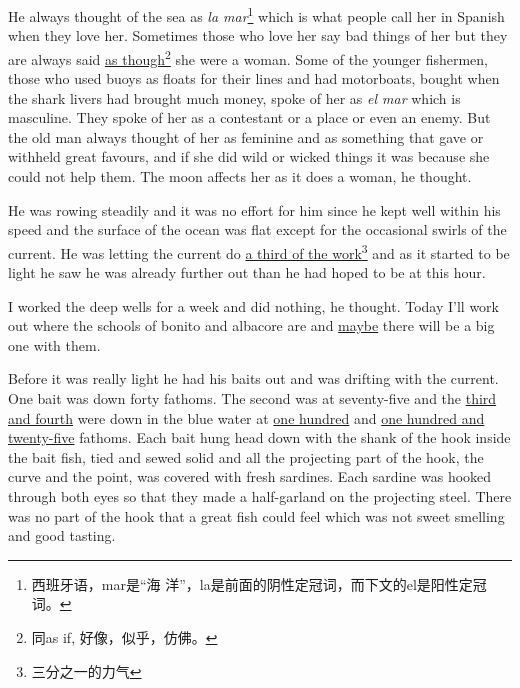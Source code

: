 He always thought of the sea as \emph{la mar}\footnote{西班牙语，mar是“海
  洋”，la是前面的阴性定冠词，而下文的el是阳性定冠词。} which is what people
call her in Spanish when they love her. Sometimes those who love her say bad
things of her but they are always said \uline{as though}\footnote{同as if,
  好像，似乎，仿佛。} she were a woman. Some of
the younger fishermen, those who used \glspl{buoy} as \glspl{float} for
their lines and had motorboats, bought when the shark livers had brought
much money, spoke of her as \emph{el mar} which is \gls{masculine}. They
spoke of her as a \gls{contestant} or a place or even an \gls{enemy}. But
the old man always thought of her as \gls{feminine} and as something that
gave or \gls{withheld} great \glspl{favour}, and if she did wild or
\gls{wicked} things it was because she could not help them. The moon
\glspl{affect} her as it does a woman, he thought.

He was rowing \gls{steadily} and it was no \gls{effort} for him \gls{since} he kept well
within his speed and the surface of the ocean was flat except for the
\gls{occasional} swirls of the current. He was letting the current do \uline{a third of
the work}\footnote{三分之一的力气} and as it started to be light he saw he was already further out
than he had hoped to be at this hour.

I worked the deep wells for a week and did nothing, he thought. Today I'll
work out where the schools of \gls{bonito} and \gls{albacore} are and
\uline{maybe} there will be a big one with them.

Before it was really light he had his baits out and was \gls{drifting} with
the current. One bait was down forty fathoms. The second was at seventy-five
and the \uline{third and fourth} were down in the blue water at \uline{one hundred}
and \uline{one hundred and twenty-five} fathoms. Each bait \gls{hung} head
down with the \gls{shank} of the hook inside the bait fish, \gls{tied} and
\gls{sewed} \gls{solid} and all the \gls{projecting} part of the hook, the
\gls{curve} and the point, was covered with fresh sardines. Each sardine was
hooked through both eyes so that they made a half-\gls{garland} on the
projecting \gls{steel}. There was no part of the hook that a great fish
could feel which was not sweet smelling and good tasting.

